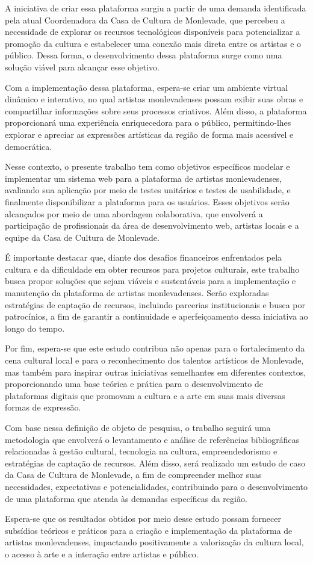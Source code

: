 A iniciativa de criar essa plataforma surgiu a partir de uma demanda identificada pela atual Coordenadora da Casa de Cultura de Monlevade, que percebeu a necessidade de explorar os recursos tecnológicos disponíveis para potencializar a promoção da cultura e estabelecer uma conexão mais direta entre os artistas e o público. Dessa forma, o desenvolvimento dessa plataforma surge como uma solução viável para alcançar esse objetivo.

Com a implementação dessa plataforma, espera-se criar um ambiente virtual dinâmico e interativo, no qual artistas monlevadenses possam exibir suas obras e compartilhar informações sobre seus processos criativos. Além disso, a plataforma proporcionará uma experiência enriquecedora para o público, permitindo-lhes explorar e apreciar as expressões artísticas da região de forma mais acessível e democrática.

Nesse contexto, o presente trabalho tem como objetivos específicos modelar e implementar um sistema web para a plataforma de artistas monlevadenses, avaliando sua aplicação por meio de testes unitários e testes de usabilidade, e finalmente disponibilizar a plataforma para os usuários. Esses objetivos serão alcançados por meio de uma abordagem colaborativa, que envolverá a participação de profissionais da área de desenvolvimento web, artistas locais e a equipe da Casa de Cultura de Monlevade.

É importante destacar que, diante dos desafios financeiros enfrentados pela cultura e da dificuldade em obter recursos para projetos culturais, este trabalho busca propor soluções que sejam viáveis e sustentáveis para a implementação e manutenção da plataforma de artistas monlevadenses. Serão exploradas estratégias de captação de recursos, incluindo parcerias institucionais e busca por patrocínios, a fim de garantir a continuidade e aperfeiçoamento dessa iniciativa ao longo do tempo.

Por fim, espera-se que este estudo contribua não apenas para o fortalecimento da cena cultural local e para o reconhecimento dos talentos artísticos de Monlevade, mas também para inspirar outras iniciativas semelhantes em diferentes contextos, proporcionando uma base teórica e prática para o desenvolvimento de plataformas digitais que promovam a cultura e a arte em suas mais diversas formas de expressão.

Com base nessa definição de objeto de pesquisa, o trabalho seguirá uma metodologia que envolverá o levantamento e análise de referências bibliográficas relacionadas à gestão cultural, tecnologia na cultura, empreendedorismo e estratégias de captação de recursos. Além disso, será realizado um estudo de caso da Casa de Cultura de Monlevade, a fim de compreender melhor suas necessidades, expectativas e potencialidades, contribuindo para o desenvolvimento de uma plataforma que atenda às demandas específicas da região.

Espera-se que os resultados obtidos por meio desse estudo possam fornecer subsídios teóricos e práticos para a criação e implementação da plataforma de artistas monlevadenses, impactando positivamente a valorização da cultura local, o acesso à arte e a interação entre artistas e público.

